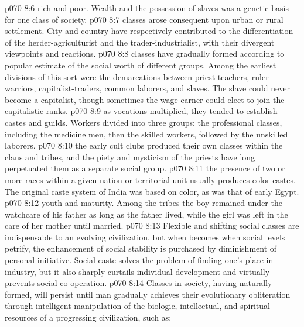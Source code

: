 \pc \vs p070 8:6 \bibnobreakspace {}rich and poor. Wealth and the possession of slaves was a genetic basis for one class of society.
\pc \vs p070 8:7 \bibnobreakspace {}classes arose consequent upon urban or rural settlement. City and country have respectively contributed to the differentiation of the herder\hyp{}agriculturist and the trader\hyp{}industrialist, with their divergent viewpoints and reactions.
\pc \vs p070 8:8 \bibnobreakspace {}classes have gradually formed according to popular estimate of the social worth of different groups. Among the earliest divisions of this sort were the demarcations between priest\hyp{}teachers, ruler\hyp{}warriors, capitalist\hyp{}traders, common laborers, and slaves. The slave could never become a capitalist, though sometimes the wage earner could elect to join the capitalistic ranks.
\pc \vs p070 8:9 \bibnobreakspace {}as vocations multiplied, they tended to establish castes and guilds. Workers divided into three groups: the professional classes, including the medicine men, then the skilled workers, followed by the unskilled laborers.
\pc \vs p070 8:10 \bibnobreakspace {}the early cult clubs produced their own classes within the clans and tribes, and the piety and mysticism of the priests have long perpetuated them as a separate social group.
\pc \vs p070 8:11 \bibnobreakspace {}the presence of two or more races within a given nation or territorial unit usually produces color castes. The original caste system of India was based on color, as was that of early Egypt.
\pc \vs p070 8:12 \bibnobreakspace {}youth and maturity. Among the tribes the boy remained under the watchcare of his father as long as the father lived, while the girl was left in the care of her mother until married.
\pc \vs p070 8:13 Flexible and shifting social classes are indispensable to an evolving civilization, but when  becomes  when social levels petrify, the enhancement of social stability is purchased by diminishment of personal initiative. Social caste solves the problem of finding one’s place in industry, but it also sharply curtails individual development and virtually prevents social co\hyp{}operation.
\vs p070 8:14 Classes in society, having naturally formed, will persist until man gradually achieves their evolutionary obliteration through intelligent manipulation of the biologic, intellectual, and spiritual resources of a progressing civilization, such as:\plusone
